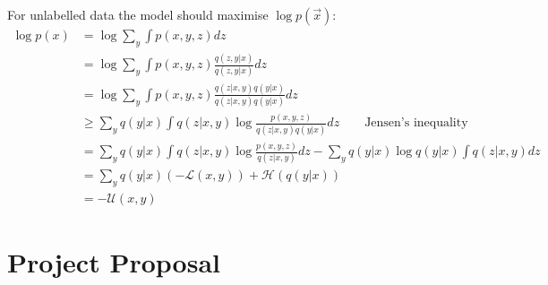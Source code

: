 For unlabelled data the model should maximise $\log p(\vec{x})$:
\begingroup
\allowdisplaybreaks
\begin{align*}
  \log p(x) & = \log \sum_{y} \int p(x, y, z) dz \\
  & = \log \sum_{y} \int p(x, y, z) \frac{q(z, y|x)}{q(z, y|x)} dz\\
  & = \log \sum_{y} \int p(x, y, z) \frac{q(z|x, y)q(y|x)}{q(z|x, y)q(y|x)} dz\\
  & \geq \sum_{y} q(y|x) \int q(z|x, y) \log\frac{p(x, y, z)}{q(z|x, y)q(y|x)} dz \qquad \text{Jensen's inequality}\\
  & = \sum_{y} q(y|x) \int q(z|x, y) \log\frac{p(x, y, z)}{q(z|x, y)} dz - \sum_{y} q(y|x) \log q(y|x) \int q(z|x, y) dz\\
  & = \sum_{y} q(y|x)(-\mathcal{L}(x, y)) + \mathcal{H}(q(y|x)) \\
  & = -\mathcal{U}(x, y)
\end{align*}
\endgroup

\chapter{Project Proposal} \label{proposal}
